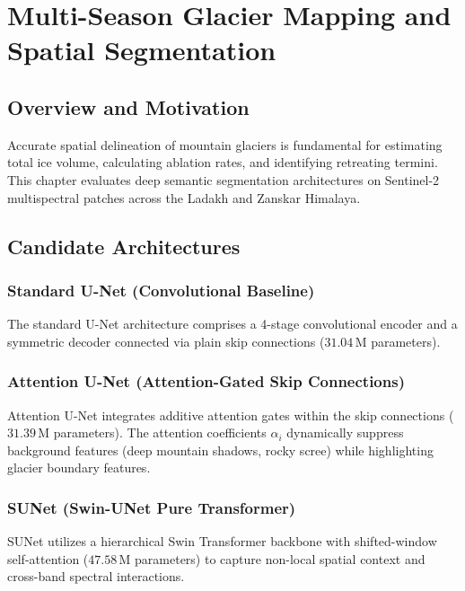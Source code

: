 \documentclass[12pt,a4paper]{report}
\begin{document}
\chapter{Multi-Season Glacier Mapping and Spatial Segmentation}

\section{Overview and Motivation}
Accurate spatial delineation of mountain glaciers is fundamental for estimating total ice volume, calculating ablation rates, and identifying retreating termini. This chapter evaluates deep semantic segmentation architectures on Sentinel-2 multispectral patches across the Ladakh and Zanskar Himalaya.

\section{Candidate Architectures}
\subsection{Standard U-Net (Convolutional Baseline)}
The standard U-Net architecture comprises a 4-stage convolutional encoder and a symmetric decoder connected via plain skip connections ($31.04$\,M parameters).

\subsection{Attention U-Net (Attention-Gated Skip Connections)}
Attention U-Net integrates additive attention gates within the skip connections ($31.39$\,M parameters). The attention coefficients $\alpha_i$ dynamically suppress background features (deep mountain shadows, rocky scree) while highlighting glacier boundary features.

\subsection{SUNet (Swin-UNet Pure Transformer)}
SUNet utilizes a hierarchical Swin Transformer backbone with shifted-window self-attention ($47.58$\,M parameters) to capture non-local spatial context and cross-band spectral interactions.
\end{document}
